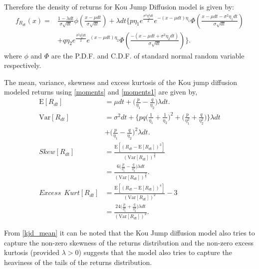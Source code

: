 \documentclass[12pt]{report}
\newcommand{\E}{\mathrm{E}}
\newcommand{\Var}{\mathrm{Var}}
\begin{document}
 Therefore the density of returns for Kou Jump Diffusion model is given by:
\begin{equation}
\begin{aligned}
f_{R_{dt}}(x) = &\frac{1 - \lambda dt}{\sigma \sqrt{dt}} \phi\left(\frac{x- \mu dt}{\sigma \sqrt{dt}}\right) + \lambda dt \Bigg\{p \eta_{1} e^{\frac{\sigma^{2} \eta_1^{2} dt}{2}} e^{-(x-\mu dt)\eta_1} \Phi\left(\frac{x - \mu dt - \sigma^{2} \eta_1 dt}{\sigma \sqrt{dt}}\right)\\ 
& + q \eta_{2} e^{\frac{\sigma^{2} \eta_2^{2} dt}{2}} e^{(x-\mu dt)\eta_2} \Phi\left(\frac{-(x - \mu dt + \sigma^{2} \eta_2 dt)}{\sigma \sqrt{dt}}\right) \Bigg\}.
\end{aligned}
\label{kou_density}
\end{equation}
where $\phi$ and $\Phi$ are the P.D.F. and C.D.F. of standard normal random variable respectively.

The mean, variance, skewness and excess kurtosis of the Kou jump diffusion modeled returns using \ref{moments}  and \ref{moments1} are given by,\\
\begin{equation}
    \begin{aligned}
    \E[R_{dt}] &= \mu dt +  \Big(\frac{p}{\eta_1} - \frac{q}{\eta_2}\Big)\lambda dt. \\
    \Var[R_{dt}]& = \sigma^{2} dt + \Big\{pq\Big(\frac{1}{\eta_1} + \frac{1}{\eta_2} \Big)^{2} + \Big(\frac{p}{\eta^{2}_1} + \frac{q}{\eta^{2}_2} \Big)\Big\} \lambda dt \\
    & + \Big(\frac{p}{\eta_1} - \frac{q}{\eta_2} \Big)^{2} \lambda dt.\\
    Skew[R_{dt}] &= \frac{\E[(R_{dt}- \E[R_{dt}])^{3}]}{(\Var[R_{dt}])^{\frac{3}{2}}}\\
    & = \frac{6 \Big(\frac{p}{\eta^{3}_1} - \frac{q}{\eta^{3}_2 }\Big)  \lambda dt}{(\Var[R_{dt}])^{\frac{3}{2}}}.\\
    Excess~~Kurt[R_{dt}] &= \frac{\E[(R_{dt}- \E[R_{dt}])^{4}]}{(\Var[R_{dt}])^{2}} - 3\\
    & = \frac{24 \Big(\frac{p}{\eta^{4}_1}\Big + \frac{q}{\eta^{4}_2} \Big) \lambda dt}{(\Var[R_{dt}])^{2}}.
    
    \end{aligned}
\label{kjd_mean}    
\end{equation}

From \ref{kjd_mean} it can be noted that the Kou Jump diffusion model also tries to capture the non-zero skewness of the returns distribution and the non-zero excess kurtosis (provided $\lambda > 0$) suggests that the model also tries to capture the heaviness of the tails of the returns distribution.
\end{document}
